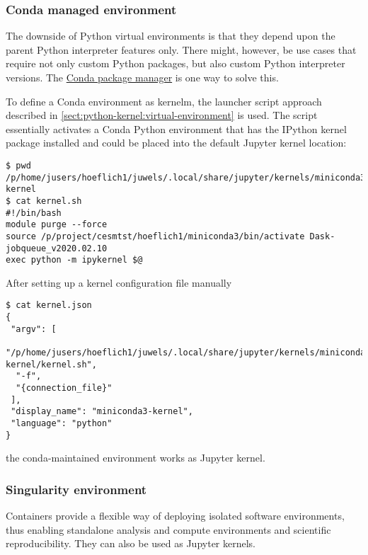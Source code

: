 \subsubsection{Conda managed environment}
\label{sect:conda-environment}

The downside of Python virtual environments is that they depend upon the parent Python interpreter features only.
There might, however, be use cases that require not only custom Python packages, but also custom Python interpreter versions.
The \href{https://conda.io/en/latest/}{Conda package manager} is one way to solve this.

To define a Conda environment as kernelm, the launcher script approach described in \ref{sect:python-kernel:virtual-environment} is used.
The script essentially activates a Conda Python environment that has the IPython kernel package installed and could be placed into the default Jupyter kernel location:
%
\begin{verbatim}
$ pwd
/p/home/jusers/hoeflich1/juwels/.local/share/jupyter/kernels/miniconda3-kernel
$ cat kernel.sh
#!/bin/bash
module purge --force
source /p/project/cesmtst/hoeflich1/miniconda3/bin/activate Dask-jobqueue_v2020.02.10
exec python -m ipykernel $@
\end{verbatim}

After setting up a kernel configuration file manually
%
\begin{verbatim}
$ cat kernel.json
{
 "argv": [
  "/p/home/jusers/hoeflich1/juwels/.local/share/jupyter/kernels/miniconda3-kernel/kernel.sh",
  "-f",
  "{connection_file}"
 ],
 "display_name": "miniconda3-kernel",
 "language": "python"
}
\end{verbatim}
%
the conda-maintained environment works as Jupyter kernel.


\subsubsection{Singularity environment}
\label{sect:container-based-environment}

Containers provide a flexible way of deploying isolated software environments, thus enabling standalone analysis and compute environments and scientific reproducibility.
They can also be used as Jupyter kernels.

